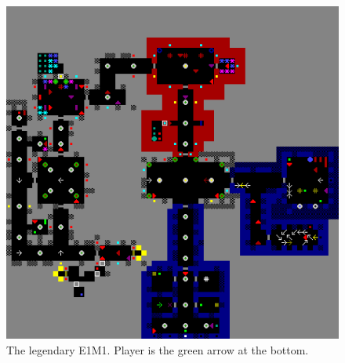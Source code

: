 \begin{figure}[H]
  \centering
 \includegraphics[width=\textwidth]{imgs/e1m1.png}
 \caption{The legendary E1M1. Player is the green arrow at the bottom.}
\end{figure}




